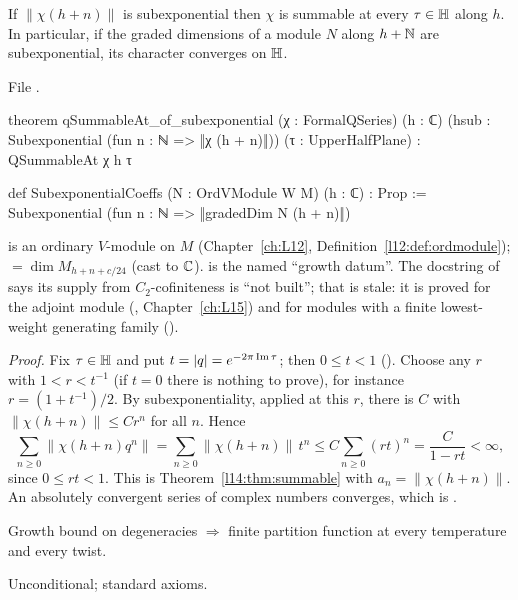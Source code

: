 \begin{theorem}\label{l14:thm:qsummable}
If $\|\chi(h+n)\|$ is subexponential then $\chi$ is summable at every $\tau\in\mathbb{H}$ along $h$. In particular, if the
graded dimensions of a module $N$ along $h+{\mathbb{N}}$ are subexponential, its character converges on $\mathbb{H}$.
\end{theorem}
\noindent File .
\begin{leancode}
theorem qSummableAt_of_subexponential (χ : FormalQSeries) (h : ℂ)
    (hsub : Subexponential (fun n : ℕ => ‖χ (h + n)‖)) (τ : UpperHalfPlane) :
    QSummableAt χ h τ

def SubexponentialCoeffs (N : OrdVModule W M) (h : ℂ) : Prop :=
  Subexponential (fun n : ℕ => ‖gradedDim N (h + n)‖)
\end{leancode}
\begin{dictionary}
 is an ordinary $V$-module on $M$ (Chapter~\ref{ch:L12}, Definition~\ref{l12:def:ordmodule});
 $=\dim M_{h+n+c/24}$ (cast to ${\mathbb{C}}$).  is the named ``growth datum''. The
docstring of  says its supply from $C_2$-cofiniteness is ``not built''; that is stale: it
is proved for the adjoint module (, Chapter~\ref{ch:L15}) and for modules
with a finite lowest-weight generating family ().
\end{dictionary}
\noindent\emph{Proof.} Fix $\tau\in\mathbb{H}$ and put $t = |q| = e^{-2\pi\operatorname{Im}\tau}$; then $0\le t<1$
(). Choose any $r$ with $1<r<t^{-1}$ (if $t = 0$ there is nothing to prove), for instance
$r = (1+t^{-1})/2$. By subexponentiality, applied at this $r$, there is $C$ with $\|\chi(h+n)\|\le Cr^n$ for all $n$. Hence
\begin{equation*}
  \sum_{n\ge0}\|\chi(h+n)q^n\| = \sum_{n\ge0}\|\chi(h+n)\|\,t^n \le C\sum_{n\ge0}(rt)^n = \frac{C}{1-rt}<\infty ,
\end{equation*}
since $0\le rt<1$. This is Theorem~\ref{l14:thm:summable} with $a_n = \|\chi(h+n)\|$. An absolutely convergent series of complex
numbers converges, which is .
\begin{physics}
Growth bound on degeneracies $\Rightarrow$ finite partition function at every temperature and every twist.
\end{physics}
\begin{status}
Unconditional; standard axioms.
\end{status}

